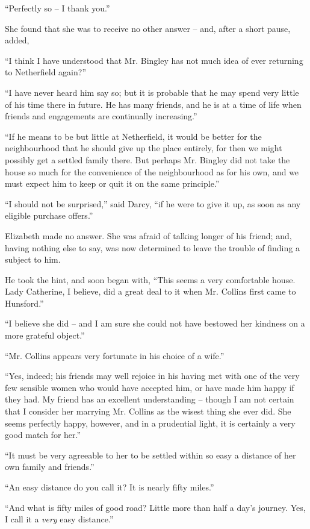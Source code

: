 “Perfectly so -- I thank you.”

She found that she was to receive no other answer -- and,
after a short pause, added,

“I think I have understood that Mr. Bingley has not
much idea of ever returning to Netherfield again?”

“I have never heard him say so; but it is probable
that he may spend very little of his time there in future.
He has many friends, and he is at a time of life when
friends and engagements are continually increasing.”

“If he means to be but little at Netherfield, it would
be better for the neighbourhood that he should give up
the place entirely, for then we might possibly get a
settled family there. But perhaps Mr. Bingley did not
take the house so much for the convenience of the neighbourhood
as for his own, and we must expect him to keep
or quit it on the same principle.”

“I should not be surprised,” said Darcy, “if he were
to give it up, as soon as any eligible purchase offers.”

Elizabeth made no answer. She was afraid of talking
longer of his friend; and, having nothing else to say,
was now determined to leave the trouble of finding a
subject to him.

He took the hint, and soon began with, “This seems
a very comfortable house. Lady Catherine, I believe,
did a great deal to it when Mr. Collins first came to
Hunsford.”

“I believe she did -- and I am sure she could not have
bestowed her kindness on a more grateful object.”

“Mr. Collins appears very fortunate in his choice of
a wife.”

“Yes, indeed; his friends may well rejoice in his
having met with one of the very few sensible women
who would have accepted him, or have made him happy
if they had. My friend has an excellent understanding -- though
I am not certain that I consider her marrying
Mr. Collins as the wisest thing she ever did. She seems
perfectly happy, however, and in a prudential light, it is
certainly a very good match for her.”

“It must be very agreeable to her to be settled within
so easy a distance of her own family and friends.”

“An easy distance do you call it? It is nearly fifty
miles.”

“And what is fifty miles of good road? Little more
than half a day’s journey. Yes, I call it a \textit{very} easy
distance.”

